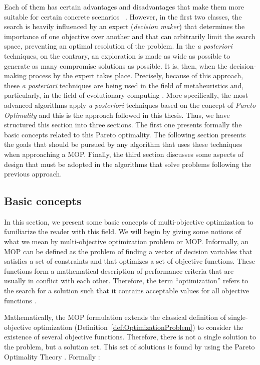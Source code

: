 Each of them has certain advantages and disadvantages that make them more suitable for certain concrete scenarios ~\cite{coello07evolutionary, deb01multiobjective}. However, in the first two classes, the search is heavily influenced by an expert (\emph{decision maker}) that determines the importance of one objective over another and that can arbitrarily limit the search space, preventing an optimal resolution of the problem. In the \emph{a posteriori} techniques, on the contrary, an exploration is made as wide as possible to generate as many compromise solutions as possible. It is, then, when the decision-making process by the expert takes place. Precisely, because of this approach, these \emph{a posteriori} techniques are being used in the field of metaheuristics and, particularly, in the field of evolutionary computing \cite{coello07evolutionary, deb01multiobjective}. More specifically, the most advanced algorithms apply \emph{a posteriori} techniques based on the concept of \emph{Pareto Optimality} \cite{pareto96cours} and this is the approach followed in this thesis. Thus, we have structured this section into three sections. The first one presents formally the basic concepts related to this Pareto optimality. The following section presents the goals that should be pursued by any algorithm that uses these techniques when approaching a MOP. Finally, the third section discusses some aspects of design that must be adopted in the algorithms that solve problems following the previous approach.

\subsection{Basic concepts}
\label{ssec:MOBasicConcepts}

In this section, we present some basic concepts of multi-objective optimization to familiarize the reader with this field. We will begin by giving some notions of what we mean by multi-objective optimization problem or MOP. Informally, an MOP can be defined as the problem of finding a vector of decision variables that satisfies a set of constraints and that optimizes a set of objective functions. These functions form a mathematical description of performance criteria that are usually in conflict with each other. Therefore, the term ``optimization'' refers to the search for a solution such that it contains acceptable values for all objective functions \cite{osyczka85multicriteria}.

Mathematically, the MOP formulation extends the classical definition of single-objective optimization (Definition~\ref{def:OptimizationProblem}) to consider the existence of several objective functions. Therefore, there is not a single solution to the problem, but a solution set. This set of solutions is found by using the Pareto Optimality Theory \cite{ehrgott05multicriteria}. Formally \cite{veldhuizen99phd}:

